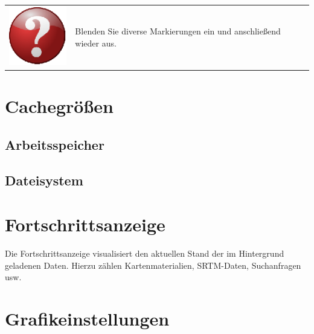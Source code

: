 \documentclass[10pt]{scrreprt}
\begin{document}
\vspace{3mm}
\begin{tabular}{>{\centering \arraybackslash}m{1cm} m{14cm}}
\includegraphics[scale=0.5]{images/quest.eps} & Blenden Sie diverse Markierungen ein und anschließend wieder aus.
\end{tabular}





\vspace{3mm}
\section{Cachegrößen} 

\vspace{3mm}
\subsection{Arbeitsspeicher}  

\vspace{3mm}
\subsection{Dateisystem}  


\newpage
\vspace{3mm}
\section{Fortschrittsanzeige} 
Die Fortschrittsanzeige visualisiert den aktuellen Stand der im Hintergrund geladenen Daten. Hierzu zählen Kartenmaterialien, SRTM-Daten, Suchanfragen usw.



\vspace{3mm}
\section{Grafikeinstellungen} 

\vspace{3mm}
\end{document}
